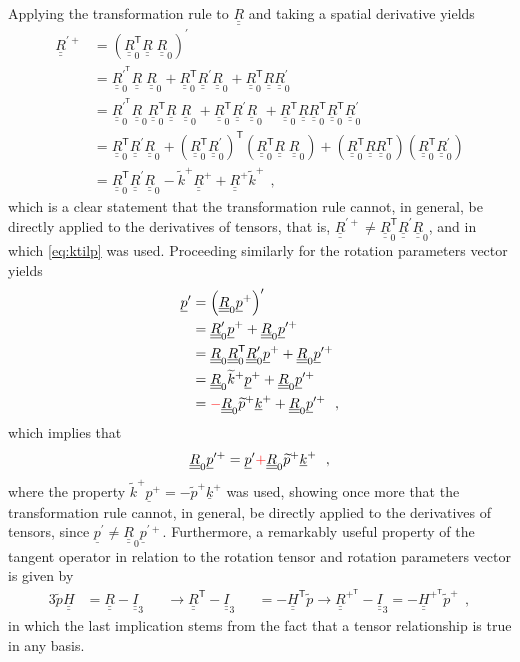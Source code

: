 \documentclass[12pt,a4paper,oneside,english]{abntex2} %
\newcommand{\fix}[1]{{\color{red}#1}}
\newcommand{\vect}[1]{\underline{#1}}
\def\tens#1{\underline{\underline{#1}}}
\def\til#1{\widetilde{#1}}
\def\lp{\left(}
\def\rp{\right)}
\def\T{\mathsf{T}}
\def\Ithree{\tens{I}_3}
\def\R{\tens{R}}
\def\RT{\R^\T}
\def\Rp{\R^+}
\def\RpT{\R^{+^\T}}
\def\Rprime{\R^{\prime}}
\def\Rpprime{\R^{\prime +}}
\def\Rz{\R_0}
\def\Rzp{\R^{\prime}_0}
\def\RzpT{\R^{\prime^\T}_0}
\def\RzT{\R^\T_0}
\def\k{\vect{k}}
\def\kp{\k^{+}}
\def\ktil{\til{k}}
\def\ktilp{\ktil^{+}}
\def\H{\tens{H}}
\def\HT{\H^\T}
\def\HpT{\H^{+^\T}}
\def\p{\vect{p}}
\def\pprime{\p^{\prime}}
\def\pplus{\p^{+}}
\def\ppprime{\p^{\prime{+}}}
\def\ptil{\til{p}}
\def\pptil{\til{p}^+}
\begin{document}
\begin{apendicesenv}
Applying the transformation rule to $\R$ and taking a spatial derivative yields
\begin{align}
    \Rpprime &= \lp\RzT\R\;\Rz\rp^\prime
    \nonumber 
    \\
    &= \RzpT\R\;\Rz + \RzT\Rprime\Rz + \RzT\R\Rzp
    \nonumber 
    \\
    &= \RzpT\Rz\RzT\R\;\Rz + \RzT\Rprime\Rz + \RzT\R\RzT\RzT\Rzp
    \nonumber 
    \\
    &= \RzT\Rprime\Rz + \lp\RzT\Rzp\rp^\T\lp\RzT\R\;\Rz\rp + \lp\RzT\R\RzT\rp\lp\RzT\Rzp\rp
    \nonumber 
    \\
    &= \RzT\Rprime\Rz - \ktilp\Rp + \Rp\ktilp \ \ ,
    \label{eq:Rpprime_appendix}
\end{align}
which is a clear statement that the transformation rule cannot, in general, be directly applied to the derivatives of tensors, that is, $\Rpprime \neq \RzT\Rprime\Rz$, and in which \cref{eq:ktilp} was used. Proceeding similarly for the rotation parameters vector yields 
\begin{align}
    \pprime &= \lp\Rz\pplus\rp^\prime
    \nonumber 
    \\
    &= \Rzp\pplus + \Rz\ppprime
    \nonumber 
    \\
    &= \Rz\RzT\Rzp\pplus + \Rz\ppprime
    \nonumber 
    \\
    &= \Rz\ktilp\pplus + \Rz\ppprime
    \nonumber 
    \\
    &= \fix{-}\Rz\pptil\kp + \Rz\ppprime \ \ ,
    \label{eq:pprime_appendix}
\end{align}
which implies that
\begin{align}
    \Rz\ppprime = \pprime \fix{+} \Rz\pptil\kp \ \ ,
    \label{eq:Rzppprime}
\end{align}
\fix{where the property $\ktilp\pplus=-\pptil\kp$ was used,} showing once more that the transformation rule cannot, in general, be directly applied to the derivatives of tensors, since $\pprime \neq \Rz\ppprime$. Furthermore, a remarkably useful property of the tangent operator in relation to the rotation tensor and rotation parameters vector is given by \cite{bauchau2011flexible} 
\begin{alignat}{3}
    \ptil\H &= \R - \Ithree &&\rightarrow \RT - \Ithree &&= -\HT\ptil \rightarrow \RpT - \Ithree = -\HpT\pptil \ \ ,
    \label{eq:H_prop}
\end{alignat}
in which the last implication stems from the fact that a tensor relationship is true in any basis.


\end{apendicesenv}
\end{document}
